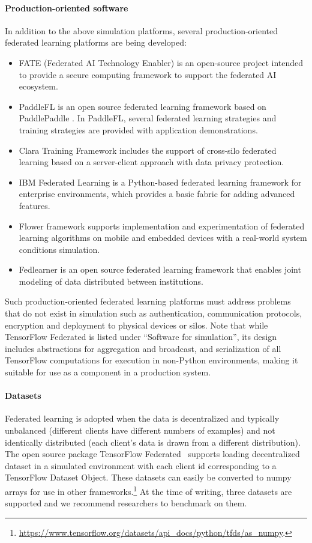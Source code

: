\documentclass[11pt]{article}
\begin{document}
\paragraph{Production-oriented software} In addition to the above simulation platforms, several production-oriented federated learning platforms are being developed:
\begin{itemize}
    \item FATE (Federated AI Technology Enabler) \citep{FATE} is an open-source project intended to provide a secure computing framework to support the federated AI ecosystem.
    \item PaddleFL \citep{PaddleFL} is an open source federated learning framework based on PaddlePaddle \citep{PaddlePaddle}. In PaddleFL, several federated learning strategies and training strategies are provided with application demonstrations.
    \item Clara Training Framework \citep{ClaraTraining} includes the support of cross-silo federated learning based on a server-client approach with data privacy protection.
    \item IBM Federated Learning \citep{IBMFL} is a Python-based federated learning framework for enterprise environments, which provides a basic fabric for adding advanced features.
    \item Flower framework \citep{beutel2020flower} supports implementation and experimentation of federated learning algorithms on mobile and embedded devices with a real-world system conditions simulation.
    \item Fedlearner \citep{Fedlearner} is an open source federated learning framework that enables joint modeling of data distributed between institutions.
\end{itemize}
Such production-oriented federated learning platforms must address problems that do not exist in simulation such as authentication, communication protocols, encryption and deployment to physical devices or silos. Note that while TensorFlow Federated is listed under ``Software for simulation'', its design includes abstractions for aggregation and broadcast, and serialization of all TensorFlow computations for execution in non-Python environments, making it suitable for use as a component in a production system.


\paragraph{Datasets} Federated learning is adopted when the data is decentralized and typically unbalanced (different clients have different numbers of examples) and not identically distributed (each client's data is drawn from a different distribution). The open source package TensorFlow Federated~\citep{tff} supports loading decentralized dataset in a simulated environment with each client id corresponding to a TensorFlow Dataset Object. These datasets can easily be converted to numpy arrays for use in other frameworks.\footnote{\url{https://www.tensorflow.org/datasets/api_docs/python/tfds/as_numpy}.} At the time of writing, three datasets are supported and we recommend researchers to benchmark on them.
\end{document}

